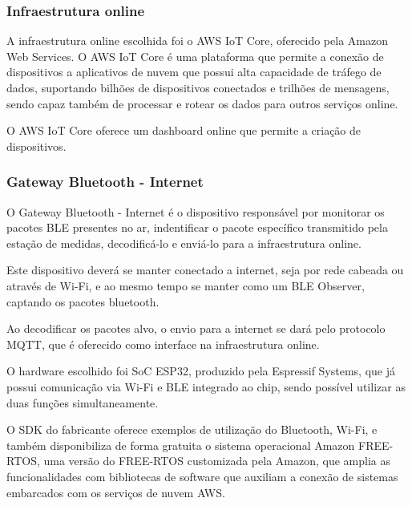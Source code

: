 

\subsubsection{Infraestrutura online}

A infraestrutura online escolhida foi o AWS IoT Core, oferecido pela Amazon Web
Services. O AWS IoT Core é uma plataforma que permite a conexão de dispositivos
a aplicativos de nuvem que possui alta capacidade de tráfego de dados,
suportando bilhões de dispositivos conectados e trilhões de mensagens, sendo
capaz também de processar e rotear os dados para outros serviços online.
\cite{AWS_IoTCore}


O AWS IoT Core oferece um dashboard online que permite a criação de dispositivos.




\subsubsection{Gateway Bluetooth - Internet}


O Gateway Bluetooth - Internet é o dispositivo responsável por monitorar os
pacotes BLE presentes no ar, indentificar o pacote específico transmitido pela
estação de medidas, decodificá-lo e enviá-lo para a infraestrutura online.

Este dispositivo deverá se manter conectado a internet, seja por rede cabeada
ou através de Wi-Fi, e ao mesmo tempo se manter como um BLE Observer, captando os
pacotes bluetooth.

Ao decodificar os pacotes alvo, o envio para a internet se dará pelo protocolo MQTT,
que é oferecido como interface na infraestrutura online.


O hardware escolhido foi SoC ESP32, produzido pela Espressif Systems, que já possui
comunicação via Wi-Fi e BLE integrado ao chip, sendo possível utilizar as duas funções
simultaneamente.

O SDK do fabricante oferece exemplos de utilização do Bluetooth, Wi-Fi, e também disponibiliza
de forma gratuita o sistema operacional Amazon FREE-RTOS, uma versão do FREE-RTOS customizada 
pela Amazon, que amplia as funcionalidades com bibliotecas de software que auxiliam a conexão
de sistemas embarcados com os serviços de nuvem AWS.


